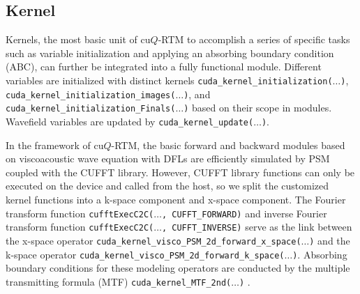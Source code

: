 \subsection{Kernel}

Kernels, the most basic unit of cu$Q$-RTM to accomplish a series of specific tasks such as variable initialization and applying an absorbing boundary condition (ABC), can further be integrated into a fully functional module.  Different variables are initialized with distinct kernels \texttt{cuda\_kernel\_initialization($\ldots$)},  \texttt{cuda\_kernel\_initialization\_images($\ldots$)}, and \texttt{cuda\_kernel\_initialization\_Finals($\ldots$)} based on their scope in modules.  Wavefield variables are updated by \texttt{cuda\_kernel\_update($\ldots$)}.

In the framework of cu$Q$-RTM, the basic forward and backward modules based on viscoacoustic wave equation with DFLs are efficiently simulated by PSM coupled with the CUFFT library. However, CUFFT library functions can only be executed on the device and called from the host, so we split the customized kernel functions into a k-space component and x-space component. The Fourier transform function \texttt{cufftExecC2C($\ldots$, CUFFT\_FORWARD)} and inverse Fourier transform function \texttt{cufftExecC2C($\ldots$, CUFFT\_INVERSE)} serve as the link between the x-space operator \texttt{cuda\_kernel\_visco\_PSM\_2d\_forward\_x\_space($\ldots$)} and the k-space operator \texttt{cuda\_kernel\_visco\_PSM\_2d\_forward\_k\_space($\ldots$)}. Absorbing boundary conditions for these modeling operators are conducted by the multiple transmitting formula (MTF) \texttt{cuda\_kernel\_MTF\_2nd($\ldots$)} \citep{liao1984transmitting}. 

